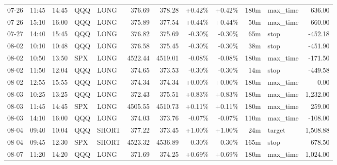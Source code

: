 \documentclass[11pt,a4paper]{article}
\begin{document}
\begin{center}
\begin{longtable}{>{\color{txtmain}}l l l l l r r r r r >{\color{txtmain}}l r}
07-26 & 11:45 & 14:45 & QQQ & LONG & 376.69 & 378.28 & \textcolor{wingreen}{+0.42\%} & \textcolor{wingreen}{+0.42\%} & 180m & max\_time & \textcolor{wingreen}{636.00} \\
07-26 & 15:10 & 16:00 & QQQ & LONG & 375.89 & 377.54 & \textcolor{wingreen}{+0.44\%} & \textcolor{wingreen}{+0.44\%} & 50m & max\_time & \textcolor{wingreen}{660.00} \\
07-27 & 14:40 & 15:45 & QQQ & LONG & 376.82 & 375.69 & \textcolor{lossred}{-0.30\%} & \textcolor{lossred}{-0.30\%} & 65m & stop & \textcolor{lossred}{-452.18} \\
08-02 & 10:10 & 10:48 & QQQ & LONG & 376.58 & 375.45 & \textcolor{lossred}{-0.30\%} & \textcolor{lossred}{-0.30\%} & 38m & stop & \textcolor{lossred}{-451.90} \\
08-02 & 10:50 & 13:50 & SPX & LONG & 4522.44 & 4519.01 & \textcolor{lossred}{-0.08\%} & \textcolor{lossred}{-0.08\%} & 180m & max\_time & \textcolor{lossred}{-171.50} \\
08-02 & 11:50 & 12:04 & QQQ & LONG & 374.65 & 373.53 & \textcolor{lossred}{-0.30\%} & \textcolor{lossred}{-0.30\%} & 14m & stop & \textcolor{lossred}{-449.58} \\
08-02 & 12:55 & 15:55 & QQQ & LONG & 374.34 & 374.34 & \textcolor{wingreen}{+0.00\%} & \textcolor{wingreen}{+0.00\%} & 180m & max\_time & \textcolor{wingreen}{0.00} \\
08-03 & 10:25 & 13:25 & QQQ & LONG & 372.43 & 375.51 & \textcolor{wingreen}{+0.83\%} & \textcolor{wingreen}{+0.83\%} & 180m & max\_time & \textcolor{wingreen}{1,232.00} \\
08-03 & 11:45 & 14:45 & SPX & LONG & 4505.55 & 4510.73 & \textcolor{wingreen}{+0.11\%} & \textcolor{wingreen}{+0.11\%} & 180m & max\_time & \textcolor{wingreen}{259.00} \\
08-03 & 14:10 & 16:00 & QQQ & LONG & 374.03 & 373.76 & \textcolor{lossred}{-0.07\%} & \textcolor{lossred}{-0.07\%} & 110m & max\_time & \textcolor{lossred}{-108.00} \\
08-04 & 09:40 & 10:04 & QQQ & SHORT & 377.22 & 373.45 & \textcolor{wingreen}{+1.00\%} & \textcolor{wingreen}{+1.00\%} & 24m & target & \textcolor{wingreen}{1,508.88} \\
08-04 & 09:45 & 12:30 & SPX & SHORT & 4523.32 & 4536.89 & \textcolor{lossred}{-0.30\%} & \textcolor{lossred}{-0.30\%} & 165m & stop & \textcolor{lossred}{-678.50} \\
08-07 & 11:20 & 14:20 & QQQ & LONG & 371.69 & 374.25 & \textcolor{wingreen}{+0.69\%} & \textcolor{wingreen}{+0.69\%} & 180m & max\_time & \textcolor{wingreen}{1,024.00} \\

\end{longtable}
\end{center}
\end{document}
